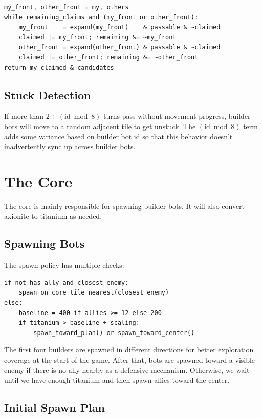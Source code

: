 \documentclass[10pt,sigconf,nonacm]{acmart}
\begin{document}
\begin{lstlisting}
my_front, other_front = my, others
while remaining_claims and (my_front or other_front):
    my_front    = expand(my_front)    & passable & ~claimed
    claimed |= my_front; remaining &= ~my_front
    other_front = expand(other_front) & passable & ~claimed
    claimed |= other_front; remaining &= ~other_front
return my_claimed & candidates
\end{lstlisting}

\subsection{Stuck Detection}

If more than $2 + (\text{id}\bmod 8)$ turns pass without movement progress, builder bots will move to a random adjacent tile to get unstuck. The $(\text{id}\bmod 8)$ term adds some variance based on builder bot id so that this behavior doesn't inadvertently sync up across builder bots.

\section{The Core}

The core is mainly responsible for spawning builder bots. It will also convert axionite to titanium as needed.

\subsection{Spawning Bots}

The spawn policy has multiple checks:

\begin{lstlisting}
if not has_ally and closest_enemy:
    spawn_on_core_tile_nearest(closest_enemy)
else:
    baseline = 400 if allies >= 12 else 200
    if titanium > baseline + scaling:
        spawn_toward_plan() or spawn_toward_center()
\end{lstlisting}

The first four builders are spawned in different directions for better exploration coverage at the start of the game. After that, bots are spawned toward a visible enemy if there is no ally nearby as a defensive mechanism. Otherwise, we wait until we have enough titanium and then spawn allies toward the center.

\subsection{Initial Spawn Plan}
\end{document}
